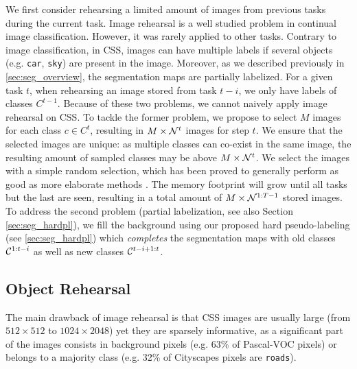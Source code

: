 We first consider rehearsing a limited amount of images from previous tasks during the current task.
Image rehearsal is a well studied problem in continual image classification. However, it was rarely
applied to other tasks. Contrary to image classification, in \ac{CSS}, images can have multiple labels if
several objects (e.g. \texttt{car}, \texttt{sky}) are present in the image. Moreover, as we
described previously in \autoref{sec:seg_overview}, the segmentation maps are partially labelized. For a
given task $t$, when rehearsing an image stored from task $t-i$, we only have labels of classes
$C^{t-1}$. Because of these two problems, we cannot naively apply image rehearsal on \ac{CSS}. To tackle
the former problem, we propose to select $M$ images for each class $c \in C^t$, resulting in $M
    \times \mathcal{N}^t$ images for step $t$. We ensure that the selected images are unique: as multiple
classes can co-exist in the same image, the resulting amount of sampled classes may be above $M
    \times \mathcal{N}^t$. We select the images with a simple random selection, which has been proved to
generally perform as good as more elaborate methods \citep{castro2018end_to_end_inc_learn}. The
memory footprint will grow until all tasks but the last are seen, resulting in a total amount of $M
    \times \mathcal{N}^{1:T-1}$ stored images. To address the second problem (partial labelization, see also
Section \ref{sec:seg_hardpl}), we fill the background using our proposed hard pseudo-labeling (see
\autoref{sec:seg_hardpl}) which \textit{completes} the segmentation maps with old classes
$\mathcal{C}^{1:t-i}$ as well as new classes $\mathcal{C}^{t-i+1:t}$.

\subsection{Object Rehearsal}
\label{sec:seg_object_rehearsal}

The main drawback of image rehearsal is that \ac{CSS} images are usually large (from $512\times 512$ to
$1024 \times 2048$) yet they are sparsely informative, as a significant part of the images consists
in background pixels \citep{lin2017focalloss} (e.g. 63\% of Pascal-VOC \citep{everingham2015pascalvoc}
pixels) or belongs to a majority class (e.g. 32\% of Cityscapes \citep{cordts2016cityscapes} pixels
are \texttt{roads}).

